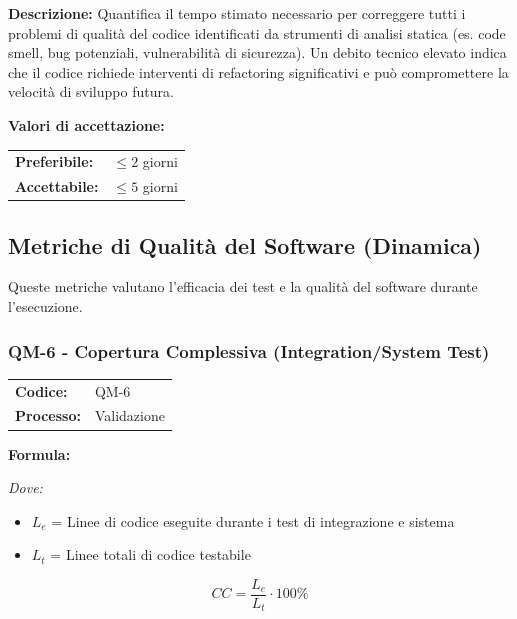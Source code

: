 \documentclass[a4paper,11pt,oneside]{scrartcl}
\begin{document}
\noindent\textbf{Descrizione:} Quantifica il tempo stimato necessario per correggere tutti i problemi di qualità del codice identificati da strumenti di analisi statica (es. code smell{\scriptsize{}}, bug potenziali, vulnerabilità di sicurezza). Un debito tecnico elevato indica che il codice richiede interventi di refactoring significativi e può compromettere la velocità di sviluppo futura.

\vspace{0.2cm}
\noindent\textbf{Valori di accettazione:}
\vspace{0.1cm}

\noindent
\begin{tabular}{@{}ll@{}}
    \textbf{Preferibile:} & $\le 2$ giorni \\
    \textbf{Accettabile:} & $\le 5$ giorni \\
\end{tabular}


\subsection{Metriche di Qualità del Software (Dinamica)}
Queste metriche valutano l'efficacia dei test e la qualità del software durante l'esecuzione.

\subsubsection{QM-6 - Copertura Complessiva (Integration/System Test)}

\noindent
\begin{tabular}{@{}p{}p{}@{}}
    \textbf{Codice:}   & QM-6        \\
    \textbf{Processo:} & Validazione \\
\end{tabular}

\vspace{0.3cm}
\noindent\textbf{Formula:}

\noindent\textit{Dove:}
\begin{itemize}[leftmargin=1.5cm, topsep=0pt, itemsep=0pt]
    \item $L_e$ = Linee di codice eseguite durante i test di integrazione e sistema
    \item $L_t$ = Linee totali di codice testabile
\end{itemize}

\[
    CC = \frac{L_e}{L_t} \cdot 100\%
\]
\end{document}

